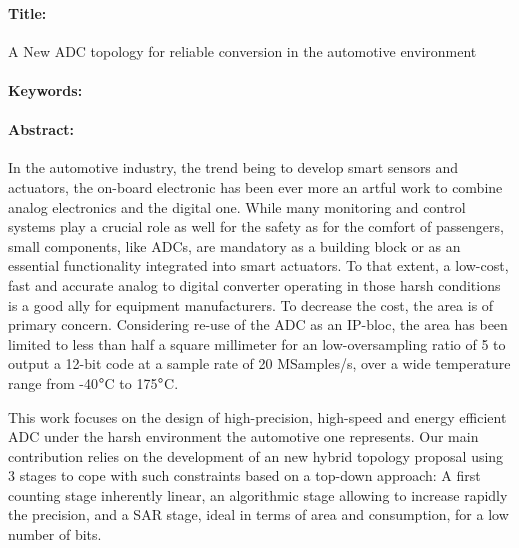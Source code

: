 \clearpage
\begin{mdframed}[linecolor=Prune,linewidth=1]
\vspace{-.25cm}
\paragraph*{Title:} A New ADC topology for reliable conversion in the automotive environment

\begin{small}
\vspace{-.25cm}
\paragraph*{Keywords:} 

\vspace{-.5cm}
\begin{multicols}{2}
\paragraph*{Abstract:} 
In the automotive industry, the trend being to develop smart sensors and actuators, the on-board electronic has been ever more an artful work to combine analog electronics and the digital one. While many monitoring and control systems play a crucial role as well for the safety as for the comfort of passengers, small components, like ADCs, are mandatory as a building block or as an essential functionality integrated into smart actuators. To that extent, a low-cost, fast and accurate analog to digital converter operating in those harsh conditions is a good ally for equipment manufacturers. To decrease the cost, the area is of primary concern. Considering re-use of the ADC as an IP-bloc, the area has been limited to less than half a square millimeter for an low-oversampling ratio of 5 to output a 12-bit code at a sample rate of 20 MSamples/s, over a wide temperature range from -40\(\degree \)C to 175\(\degree \)C.

This work focuses on the design of high-precision, high-speed and energy efficient ADC under the harsh environment the automotive one represents. Our main contribution relies on the development of an new hybrid topology proposal using 3 stages to cope with such constraints based on a top-down approach: A first counting stage inherently linear, an algorithmic stage allowing to increase rapidly the precision, and a SAR stage, ideal in terms of area and consumption, for a low number of bits.


\end{multicols}
\end{small}
\end{mdframed}
